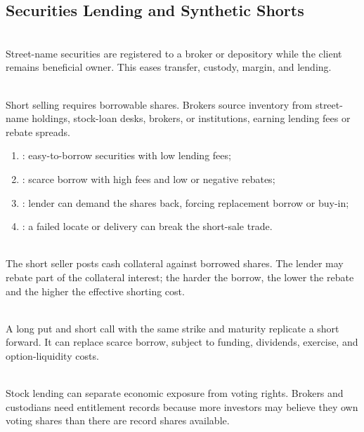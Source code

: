 \subsection{Securities Lending and Synthetic Shorts}

\begin{definition} \\
Street-name securities are registered to a broker or depository while the client remains beneficial owner. This eases transfer, custody, margin, and lending.
\end{definition}

\begin{mechanism} \\
Short selling requires borrowable shares. Brokers source inventory from street-name holdings, stock-loan desks, brokers, or institutions, earning lending fees or rebate spreads.
\end{mechanism}

\begin{taxonomy} 
\begin{enumerate}[label=\roman*.]
\setlength{\itemsep}{0pt}
\item {}: easy-to-borrow securities with low lending fees;
\item {}: scarce borrow with high fees and low or negative rebates;
\item {}: lender can demand the shares back, forcing replacement borrow or buy-in;
\item {}: a failed locate or delivery can break the short-sale trade.
\end{enumerate}
\end{taxonomy}

\begin{definition} \\
The short seller posts cash collateral against borrowed shares. The lender may rebate part of the collateral interest; the harder the borrow, the lower the rebate and the higher the effective shorting cost.
\end{definition}

\begin{principle} \\
A long put and short call with the same strike and maturity replicate a short forward. It can replace scarce borrow, subject to funding, dividends, exercise, and option-liquidity costs.
\end{principle}

\begin{caveat} \\
Stock lending can separate economic exposure from voting rights. Brokers and custodians need entitlement records because more investors may believe they own voting shares than there are record shares available.
\end{caveat}
